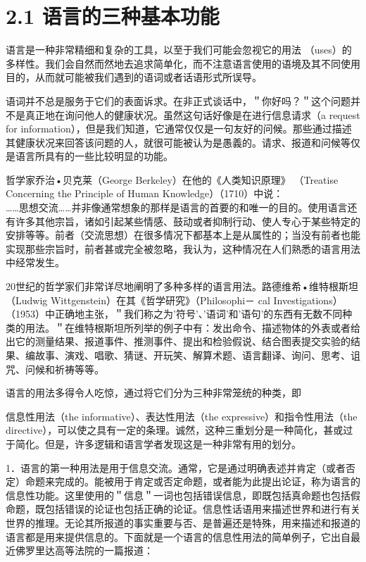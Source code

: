 \section*{2.1 语言的三种基本功能}
语言是一种非常精细和复杂的工具，以至于我们可能会忽视它的用法 （uses）的多样性。我们会自然而然地去追求简单化，而不注意语言使用的语境及其不同使用目的，从而就可能被我们遇到的语词或者话语形式所误导。

语词并不总是服务于它们的表面诉求。在非正式谈话中，＂你好吗？＂这个问题并不是真正地在询问他人的健康状况。虽然这句话好像是在进行信息请求（a request for information），但是我们知道，它通常仅仅是一句友好的问候。那些通过描述其健康状况来回答该问题的人，就很可能被认为是愚義的。请求、报道和问候等仅是语言所具有的一些比较明显的功能。

哲学家乔治•贝克莱（George Berkeley）在他的《人类知识原理》 （Treatise Concerning the Principle of Human Knowledge）（1710）中说：\\
……思想交流……并非像通常想象的那样是语言的首要的和唯一的目的。使用语言还有许多其他宗旨，诸如引起某些情感、鼓动或者抑制行动、使人专心于某些特定的安排等等。前者（交流思想）在很多情况下都基本上是从属性的；当没有前者也能实现那些宗旨时，前者甚或完全被忽略，我认为，这种情况在人们熟悉的语言用法中经常发生。

20世纪的哲学家们非常详尽地阐明了多种多样的语言用法。路德维希•维特根斯坦（Ludwig Wittgenstein）在其《哲学研究》（Philosophi－ cal Investigations）（1953）中正确地主张，＂我们称之为'符号'、'语词'和'语句'的东西有无数不同种类的用法。＂在维特根斯坦所列举的例子中有：发出命令、描述物体的外表或者给出它的测量结果、报道事件、推测事件、提出和检验假说、结合图表提交实验的结果、编故事、演戏、唱歌、猜谜、开玩笑、解算术题、语言翻译、询问、思考、诅咒、问候和祈祷等等。

语言的用法多得令人吃惊，通过将它们分为三种非常笼统的种类，即

信息性用法（the informative）、表达性用法（the expressive）和指令性用法（the directive），可以使之具有一定的条理。诚然，这种三重划分是一种简化，甚或过于简化。但是，许多逻辑和语言学者发现这是一种非常有用的划分。

1．语言的第一种用法是用于信息交流。通常，它是通过明确表述并肯定（或者否定）命题来完成的。能被用于肯定或否定命题，或者能为此提出论证，称为语言的信息性功能。这里使用的＂信息＂一词也包括错误信息，即既包括真命题也包括假命题，既包括错误的论证也包括正确的论证。信息性话语用来描述世界和进行有关世界的推理。无论其所报道的事实重要与否、是普遍还是特殊，用来描述和报道的语言都是用来提供信息的。下面就是一个语言的信息性用法的简单例子，它出自最近佛罗里达高等法院的一篇报道：

